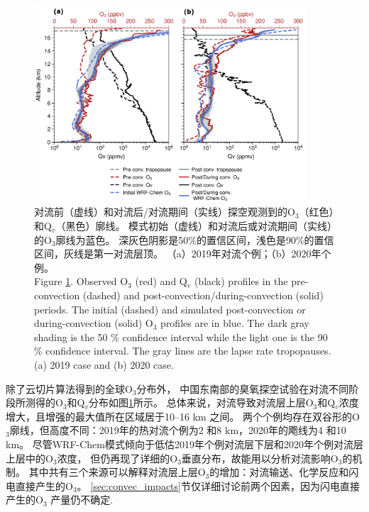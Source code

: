 \begin{figure}[H]
\centering
\includegraphics[width=0.9\textwidth]{./figures/ozonesonde_profile.png}
\caption{对流前（虚线）和对流后/对流期间（实线）探空观测到的O$_3$（红色）和Q$_v$（黑色）廓线。
模式初始（虚线）和对流后或对流期间（实线）的O$_3$廓线为蓝色。
深灰色阴影是50\%的置信区间，浅色是90\%的置信区间，灰线是第一对流层顶。
（a）2019年对流个例；（b）2020年个例。\\
Figure \ref{fig:ozonesonde_profile}. Observed O$_3$ (red) and Q$_v$ (black) profiles in the pre-convection (dashed) and post-convection/during-convection (solid) periods.
The initial (dashed) and simulated post-convection or during-convection (solid) O$_3$ profiles are in blue.
The dark gray shading is the 50 \% confidence interval while the light one is the 90 \% confidence interval.
The gray lines are the lapse rate tropopauses.
(a) 2019 case and (b) 2020 case.
}
\label{fig:ozonesonde_profile}
\end{figure}

除了云切片算法得到的全球O$_3$分布外，
中国东南部的臭氧探空试验在对流不同阶段所测得的O$_3$和Q$_v$分布如图\ref{fig:ozonesonde_profile}所示。
总体来说，对流导致对流层上层O$_3$和Q$_v$浓度增大，且增强的最大值所在区域居于10--16 km 之间。
两个个例均存在双谷形的O$_3$廓线，但高度不同：2019年的热对流个例为2 和8 km，2020年的飑线为4 和10 km。
尽管WRF-Chem模式倾向于低估2019年个例对流层下层和2020年个例对流层上层中的O$_3$浓度，
但仍再现了详细的O$_3$垂直分布，故能用以分析对流影响O$_3$的机制。
其中共有三个来源可以解释对流层上层O$_3$的增加：对流输送、化学反应和闪电直接产生的O$_3$。
\ref{sec:convec_impacts}节仅详细讨论前两个因素，因为闪电直接产生的O$_3$
产量仍不确定\citep{Morris.2010,Ripoll.2014}.



